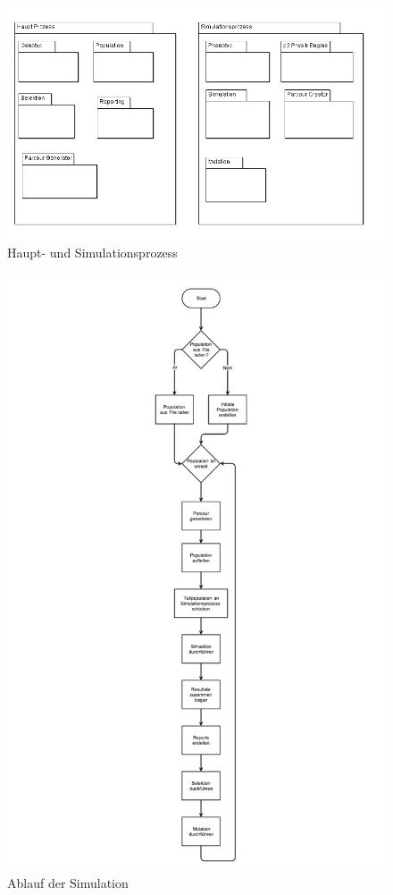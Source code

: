     \begin{figure}[H]
      \includegraphics[scale=0.45,center]{graphics/haupt_simulations_prozess}
      \caption{Haupt- und Simulationsprozess\label{fig:hauptSimuProzesse}}
    \end{figure}
    \begin{figure}[H]
      \includegraphics[width=\textwidth,center]{graphics/uml/flow-simulation}
      \caption{Ablauf der Simulation\label{fig:ablauf}}
    \end{figure}

